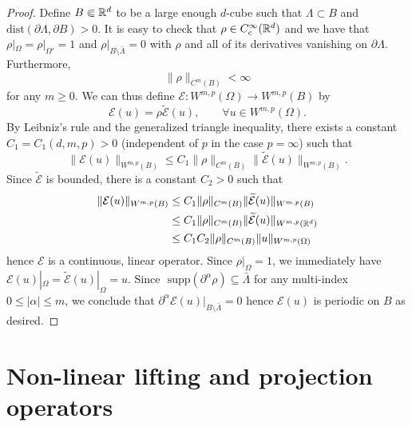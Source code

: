 \documentclass[reqno,a4paper]{amsart}
\begin{document}
\begin{proof}
Define \(B \Subset \mathbb{R}^d\) to be a large enough \(d\)-cube such that \(\Lambda \subset B\) and \(\text{dist}(\partial \Lambda, \partial B) >  0.\)
It is easy to check that \(\rho \in C^\infty_c(\mathbb{R}^d)\) and we have that \(\rho|_\Omega  = \rho|_{\Omega'} = 1\) and \(\rho|_{B \setminus \bar{\Lambda}} = 0\) with \(\rho\) and all of its 
derivatives vanishing on \(\partial \Lambda\). Furthermore,
\[\|\rho\|_{C^m(B)} < \infty\]
for any \(m \geq 0\). We can thus define \(\mathcal{E} : W^{m,p}(\Omega) \to W^{m,p}(B)\) by
\[\mathcal{E}(u) = \rho \tilde{\mathcal{E}}(u), \qquad \forall u \in W^{m,p}(\Omega).\]
By Leibniz's rule and the generalized triangle inequality,
there exists a constant \(C_1 = C_1(d,m,p) > 0\) (independent of \(p\) in the case \(p=\infty\)) such that
\[\|\mathcal{E}(u)\|_{W^{m,p}(B)} \leq C_1 \|\rho\|_{C^m(B)} \|\tilde{\mathcal{E}}(u)\|_{W^{m,p}(B)}.\]
Since \(\tilde{\mathcal{E}}\) is bounded, there is a constant \(C_2 > 0\) such that
\begin{align*}
\|\mathcal{E}(u)\|_{W^{m,p}(B)} &\leq C_1 \|\rho\|_{C^m(B)} \|\widetilde{\mathcal{E}}(u)\|_{W^{m,p}(B)} \\ 
&\leq C_1 \|\rho\|_{C^m(B)} \|\widetilde{\mathcal{E}}(u)\|_{W^{m,p}(\mathbb{R}^d)} \\ 
&\leq C_1 C_2 \|\rho\|_{C^m(B)} \|u\|_{W^{m,p}(\Omega)}
\end{align*}
hence \(\mathcal{E}\) is a continuous, linear operator. Since \(\rho|_\Omega = 1\), 
we immediately have \(\mathcal{E}(u)|_\Omega = \tilde{\mathcal{E}}(u)|_\Omega = u\). Since \(\text{ supp}(\partial^\alpha \rho) \subseteq \bar{\Lambda}\) for any multi-index \(0 \leq |\alpha| \leq m\), we conclude 
that \(\partial^{\alpha} \mathcal{E}(u) |_{B \setminus \bar{\Lambda}} = 0\)  hence \(\mathcal{E}(u)\) is periodic on \(B\) as desired.

\end{proof}


\section{Non-linear lifting and projection operators}
\end{document}
